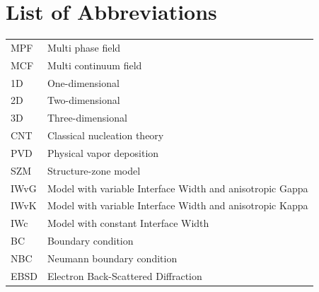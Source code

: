 \section*{List of Abbreviations}

\begin{longtable}{ll}
	MPF & Multi phase field \\
	MCF & Multi continuum field \\
	1D & One-dimensional \\
	2D & Two-dimensional \\
	3D & Three-dimensional \\
	CNT & Classical nucleation theory \\
	PVD & Physical vapor deposition \\
	SZM & Structure-zone model \\
	IWvG & Model with variable Interface Width and anisotropic Gappa  \\
	IWvK & Model with variable Interface Width and anisotropic Kappa \\
	IWc & Model with constant Interface Width  \\
	BC & Boundary condition \\
	NBC & Neumann boundary condition \\
	EBSD & Electron Back-Scattered Diffraction \\
\end{longtable}


%
%
%
%




\cleardoublepage

